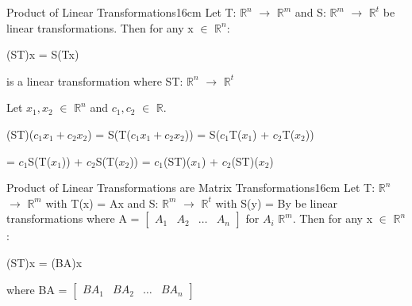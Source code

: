     \begin{definition}{Product of Linear Transformations}{16cm}
        Let T: $\mathbb{R}^n$ $\rightarrow$ $\mathbb{R}^m$
        and S: $\mathbb{R}^m$ $\rightarrow$ $\mathbb{R}^t$
        be linear transformations. Then for any x $\in$ $\mathbb{R}^n$:

        \hspace{0.5cm}
        (ST)x = S(Tx)

        is a linear transformation where
        ST: $\mathbb{R}^n$ $\rightarrow$ $\mathbb{R}^t$

        \begin{boxedminipage}{16cm}
            Let $x_1,x_2$ $\in$ $\mathbb{R}^n$ and $c_1,c_2$ $\in$ $\mathbb{R}$.

            \hspace{0.5cm}
            (ST)($c_1x_1+c_2x_2$) = S(T($c_1x_1+c_2x_2$))
            = S($c_1$T($x_1$) + $c_2$T($x_2$))

            \hspace{3.8cm}
            = $c_1$S(T($x_1$)) + $c_2$S(T($x_2$))
            = $c_1$(ST)($x_1$) + $c_2$(ST)($x_2$)
        \end{boxedminipage}
    \end{definition}

    \vspace{0.5cm}



    \begin{wtheorem}{Product of Linear Transformations are
    Matrix Transformations}{16cm}
        Let T: $\mathbb{R}^n$ $\rightarrow$ $\mathbb{R}^m$ with T(x) = Ax
        and S: $\mathbb{R}^m$ $\rightarrow$ $\mathbb{R}^t$ with S(y) = By
        be linear transformations where
        A = $\begin{bmatrix}
                A_1 & A_2 & \hdots & A_n
            \end{bmatrix}$ for $A_i$ $\mathbb{R}^m$.
        Then for any x $\in$ $\mathbb{R}^n$:

        \hspace{0.5cm}
        (ST)x = (BA)x

        where BA =
        $\begin{bmatrix}
            BA_1 & BA_2 & \hdots & BA_n
        \end{bmatrix}$
    \end{wtheorem}

